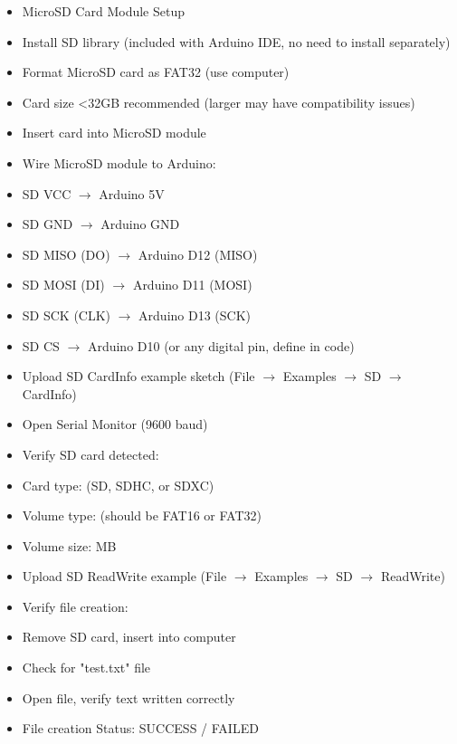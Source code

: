 \documentclass[11pt,letterpaper]{article}
\begin{document}
\begin{itemize}
  \item MicroSD Card Module Setup
  \item Install SD library (included with Arduino IDE, no need to install separately)
  \item Format MicroSD card as FAT32 (use computer)
  \item Card size <32GB recommended (larger may have compatibility issues)
  \item Insert card into MicroSD module
  \item Wire MicroSD module to Arduino:
  \item SD VCC $\rightarrow$ Arduino 5V
  \item SD GND $\rightarrow$ Arduino GND
  \item SD MISO (DO) $\rightarrow$ Arduino D12 (MISO)
  \item SD MOSI (DI) $\rightarrow$ Arduino D11 (MOSI)
  \item SD SCK (CLK) $\rightarrow$ Arduino D13 (SCK)
  \item SD CS $\rightarrow$ Arduino D10 (or any digital pin, define in code)
  \item Upload SD CardInfo example sketch (File $\rightarrow$ Examples $\rightarrow$ SD $\rightarrow$ CardInfo)
  \item Open Serial Monitor (9600 baud)
  \item Verify SD card detected:
  \item Card type: \underline{\hspace{1.5cm}} (SD, SDHC, or SDXC)
  \item Volume type: \underline{\hspace{1.5cm}} (should be FAT16 or FAT32)
  \item Volume size: \underline{\hspace{1.5cm}} MB
  \item Upload SD ReadWrite example (File $\rightarrow$ Examples $\rightarrow$ SD $\rightarrow$ ReadWrite)
  \item Verify file creation:
  \item Remove SD card, insert into computer
  \item Check for "test.txt" file
  \item Open file, verify text written correctly
  \item File creation Status: SUCCESS / FAILED
\end{itemize}
\end{document}
